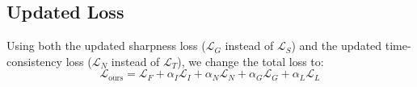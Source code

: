 \subsection{Updated Loss}
    Using both the updated sharpness loss ($\mathcal{L}_G$ instead of $\mathcal{L}_S$) and the updated time-consistency loss ($\mathcal{L}_N$ instead of $\mathcal{L}_T$), we change the total loss to:
    \begin{equation}
        \mathcal{L}_{\mathrm{ours}} = \mathcal{L}_F + \alpha_I \mathcal{L}_I + \alpha_N \mathcal{L}_N + \alpha_G \mathcal{L}_G + \alpha_L \mathcal{L}_L
    \end{equation}
